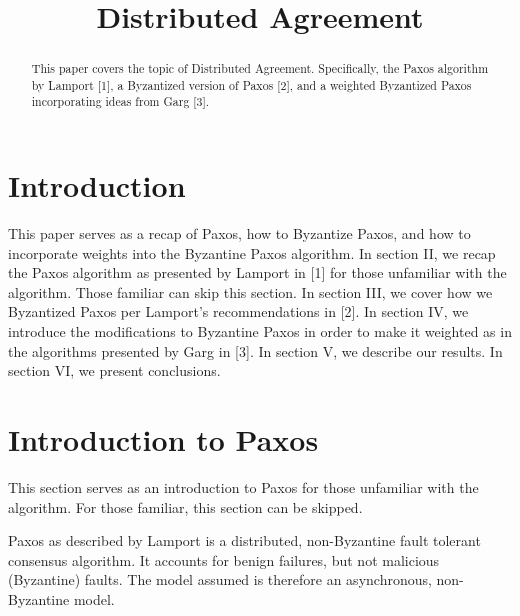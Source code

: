 \documentclass[conference]{IEEEtran}
\begin{document}
\title{Distributed Agreement\\
}

\author{
\and
{}
}

\maketitle

\begin{abstract}
This paper covers the topic of Distributed Agreement. Specifically, the Paxos algorithm by Lamport [1], a Byzantized version of Paxos [2], and a weighted Byzantized Paxos incorporating ideas from Garg [3].
\end{abstract}

\section{Introduction}
This paper serves as a recap of Paxos, how to Byzantize Paxos, and how to incorporate weights into the Byzantine Paxos algorithm. In section II, we recap the Paxos algorithm as presented by Lamport in [1] for those unfamiliar with the algorithm. Those familiar can skip this section. In section III, we cover how we Byzantized Paxos per Lamport's recommendations in [2]. In section IV, we introduce the modifications to Byzantine Paxos in order to make it weighted as in the algorithms presented by Garg in [3]. In section V, we describe our results. In section VI, we present conclusions.

\section{Introduction to Paxos}
This section serves as an introduction to Paxos for those unfamiliar with the algorithm. For those familiar, this section can be skipped.

Paxos as described by Lamport is a distributed, non-Byzantine fault tolerant consensus algorithm. It accounts for benign failures, but not malicious (Byzantine) faults. The model assumed is therefore an asynchronous, non-Byzantine model.
\end{document}
